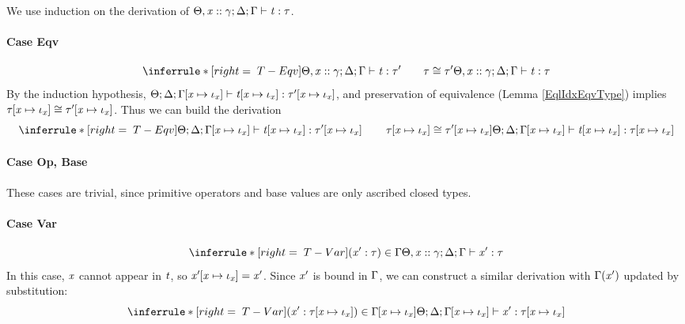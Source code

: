 \begin{sproof}
  We use induction on the derivation of
  $\Theta,\mathit{x} :: \mathit{\gamma};\Delta;\Gamma \vdash \mathit{t} : \mathit{\tau}$.
  \paragraph{Case {\sc Eqv}}
  \[\infr[T-Eqv]
  {\typeof{\sEnv,\hassort{\var}{\sort}}{\kEnv}{\tEnv}{\term}{\type'}
    \qquad \teqv{\type}{\type'}}
  {\typeof{\sEnv,\hassort{\var}{\sort}}{\kEnv}{\tEnv}{\term}{\type}}\]
  By the induction hypothesis,
  $\Theta;\Delta;\Gamma\hspace{-2pt}\left[ \mathit{x} \mapsto \mathit{\iota}_{\mathit{x}} \right] \vdash \mathit{t}\hspace{-2pt}\left[ \mathit{x} \mapsto \mathit{\iota}_{\mathit{x}} \right] : \mathit{\tau}'\hspace{-2pt}\left[ \mathit{x} \mapsto \mathit{\iota}_{\mathit{x}} \right]$,
  and preservation of equivalence (Lemma \ref{EqlIdxEqvType}) implies
  $\mathit{\tau}\hspace{-2pt}\left[ \mathit{x} \mapsto \mathit{\iota}_{\mathit{x}} \right] \cong \mathit{\tau}'\hspace{-2pt}\left[ \mathit{x} \mapsto \mathit{\iota}_{\mathit{x}} \right]$.
  Thus we can build the derivation
  \[{\infr[T-Eqv]
    {\typeof{\sEnv}{\kEnv}{\idxsubst{\tEnv}}
      {\idxsubst{\term}}{\idxsubst{\type'}}
      \qquad \teqv{\idxsubst{\type}}{\idxsubst{\type'}}}
    {\typeof{\sEnv}{\kEnv}{\idxsubst{\tEnv}}
      {\idxsubst{\term}}{\idxsubst{\type}}}}\]
  \paragraph{Case {\sc Op}, {\sc Base}}
  These cases are trivial,
  since primitive operators and base values are only ascribed closed types.
  \paragraph{Case {\sc Var}}
  \[{\infr[T-Var]
    {\parens{\hastype{\var'}{\type}} \in \tEnv}
    {\typeof{\sEnv, \hassort{\var}{\sort}}{\kEnv}{\tEnv}{\var'}{\type}}}\]
  In this case, $\mathit{x}$ cannot appear in $\mathit{t}$,
  so $\mathit{x}'\hspace{-2pt}\left[ \mathit{x} \mapsto \mathit{\iota}_{\mathit{x}} \right] = \mathit{x}'$.
  Since $\mathit{x}'$ is bound in $\Gamma$,
  we can construct a similar derivation
  with $\Gamma(\mathit{x}')$ updated by substitution:
  \[{\infr[T-Var]
    {\parens{\hastype{\var'}{\idxsubst{\type}}}
      \in \idxsubst{\tEnv}}
    {\typeof{\sEnv}{\kEnv}
      {\idxsubst{\tEnv}}
      {\var'}{\idxsubst{\type}}}}\]

\end{sproof}
